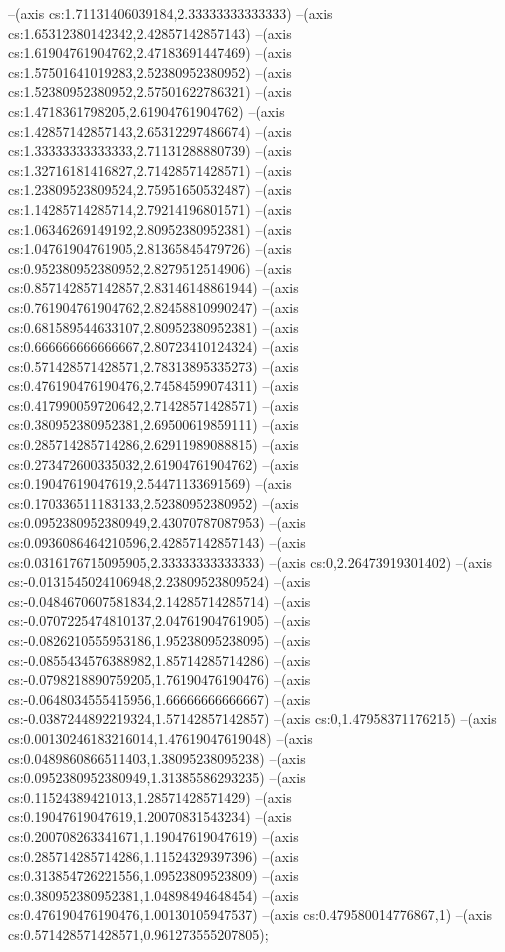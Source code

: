 --(axis cs:1.71131406039184,2.33333333333333)
--(axis cs:1.65312380142342,2.42857142857143)
--(axis cs:1.61904761904762,2.47183691447469)
--(axis cs:1.57501641019283,2.52380952380952)
--(axis cs:1.52380952380952,2.57501622786321)
--(axis cs:1.4718361798205,2.61904761904762)
--(axis cs:1.42857142857143,2.65312297486674)
--(axis cs:1.33333333333333,2.71131288880739)
--(axis cs:1.32716181416827,2.71428571428571)
--(axis cs:1.23809523809524,2.75951650532487)
--(axis cs:1.14285714285714,2.79214196801571)
--(axis cs:1.06346269149192,2.80952380952381)
--(axis cs:1.04761904761905,2.81365845479726)
--(axis cs:0.952380952380952,2.8279512514906)
--(axis cs:0.857142857142857,2.83146148861944)
--(axis cs:0.761904761904762,2.82458810990247)
--(axis cs:0.681589544633107,2.80952380952381)
--(axis cs:0.666666666666667,2.80723410124324)
--(axis cs:0.571428571428571,2.78313895335273)
--(axis cs:0.476190476190476,2.74584599074311)
--(axis cs:0.417990059720642,2.71428571428571)
--(axis cs:0.380952380952381,2.69500619859111)
--(axis cs:0.285714285714286,2.62911989088815)
--(axis cs:0.273472600335032,2.61904761904762)
--(axis cs:0.19047619047619,2.54471133691569)
--(axis cs:0.170336511183133,2.52380952380952)
--(axis cs:0.0952380952380949,2.43070787087953)
--(axis cs:0.0936086464210596,2.42857142857143)
--(axis cs:0.0316176715095905,2.33333333333333)
--(axis cs:0,2.26473919301402)
--(axis cs:-0.0131545024106948,2.23809523809524)
--(axis cs:-0.0484670607581834,2.14285714285714)
--(axis cs:-0.0707225474810137,2.04761904761905)
--(axis cs:-0.0826210555953186,1.95238095238095)
--(axis cs:-0.0855434576388982,1.85714285714286)
--(axis cs:-0.0798218890759205,1.76190476190476)
--(axis cs:-0.0648034555415956,1.66666666666667)
--(axis cs:-0.0387244892219324,1.57142857142857)
--(axis cs:0,1.47958371176215)
--(axis cs:0.00130246183216014,1.47619047619048)
--(axis cs:0.0489860866511403,1.38095238095238)
--(axis cs:0.0952380952380949,1.31385586293235)
--(axis cs:0.11524389421013,1.28571428571429)
--(axis cs:0.19047619047619,1.20070831543234)
--(axis cs:0.200708263341671,1.19047619047619)
--(axis cs:0.285714285714286,1.11524329397396)
--(axis cs:0.313854726221556,1.09523809523809)
--(axis cs:0.380952380952381,1.04898494648454)
--(axis cs:0.476190476190476,1.00130105947537)
--(axis cs:0.479580014776867,1)
--(axis cs:0.571428571428571,0.961273555207805);

